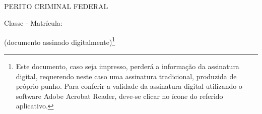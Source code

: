 \bigskip
\begin{center}
	~\bigskip

	\textbf{\MakeUppercase{\pfauthor}}
	
	PERITO CRIMINAL FEDERAL
	
	Classe \pfauthorclass\space - Matrícula: \pfauthormatr

	(documento assinado digitalmente)\footnote{Este documento, caso seja impresso, perderá a informação da assinatura digital, requerendo neste caso uma assinatura tradicional, produzida de próprio punho. Para conferir a validade da assinatura digital utilizando o software Adobe Acrobat Reader, deve-se clicar no ícone  do referido aplicativo.}
\end{center}

